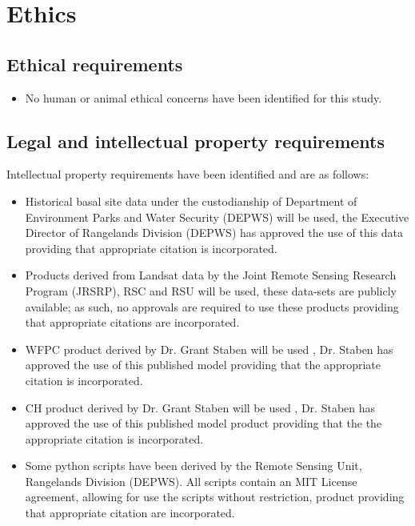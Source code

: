 \newpage

\section{Ethics}
\subsection{Ethical requirements}

\begin{itemize}
\item No human or animal ethical concerns have been identified for this study.
\end{itemize}


\subsection{Legal and intellectual property requirements}
Intellectual property requirements have been identified and are as follows:

\begin{itemize}

\item Historical basal site data under the custodianship of Department of Environment Parks and Water Security (DEPWS) will be used, the Executive Director of Rangelands Division (DEPWS) has approved the use of this data providing that appropriate citation is incorporated.

  \item Products derived from Landsat data by the Joint Remote Sensing Research Program (JRSRP), RSC and RSU will be used, these data-sets are publicly available; as such, no approvals are required to use these products providing that appropriate citations are incorporated.
  
  \item WFPC product derived by Dr. Grant Staben will be used \citep{stabenetal2018}, Dr. Staben has approved the use of this published model providing that the appropriate citation is incorporated.

  \item CH product derived by Dr. Grant Staben will be used \citep{staben2016}, Dr. Staben has approved the use of this published model product providing that the the appropriate citation is incorporated.
  
  \item Some python scripts have been derived by the Remote Sensing Unit, Rangelands Division (DEPWS). All scripts contain an MIT License agreement, allowing for use the scripts without restriction, product providing that appropriate citation are incorporated.
  
  
\end{itemize}